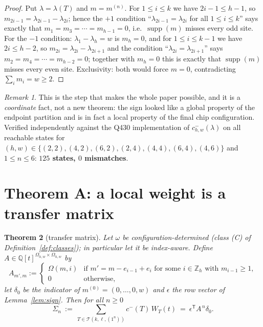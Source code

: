 \documentclass[11pt]{article}
\theoremstyle{plain}
\newtheorem{theorem}{Theorem}
\theoremstyle{definition}
\theoremstyle{remark}
\newtheorem{remark}[theorem]{Remark}
\newcommand{\Zh}{\mathbb{Z}_h}
\newcommand{\cm}{c^{-}}
\newcommand{\supp}{\operatorname{supp}}
\begin{document}
\begin{proof}
Put $\lambda=\lambda(T)$ and $m=m^{(n)}$. For $1\le i\le k$ we have $2i-1\le h-1$, so
$m_{2i-1}=\lambda_{2i-1}-\lambda_{2i}$; hence the $+1$ condition
``$\lambda_{2i-1}=\lambda_{2i}$ for all $1\le i\le k$'' says exactly that
$m_1=m_3=\cdots=m_{h-1}=0$, i.e.\ $\supp(m)$ misses every odd site. For the $-1$ condition:
$\lambda_1-\lambda_h=w$ is $m_h=0$, and for $1\le i\le k-1$ we have $2i\le h-2$, so
$m_{2i}=\lambda_{2i}-\lambda_{2i+1}$ and the condition ``$\lambda_{2i}=\lambda_{2i+1}$'' says
$m_2=m_4=\cdots=m_{h-2}=0$; together with $m_h=0$ this is exactly that $\supp(m)$ misses every
even site. Exclusivity: both would force $m=0$, contradicting $\sum_i m_i=w\ge2$.
\end{proof}

\begin{remark}
This is the step that makes the whole paper possible, and it is a \emph{coordinate} fact, not a
new theorem: the sign looked like a global property of the endpoint partition and is in fact a
local property of the final chip configuration. Verified independently against the
Q430 implementation of $\cm_{h,w}(\lambda)$ on all reachable states for
$(h,w)\in\{(2,2),(4,2),(6,2),(2,4),(4,4),(6,4),(4,6)\}$ and $1\le n\le6$: \textbf{$125$ states,
$0$ mismatches}.
\end{remark}

\section{Theorem A: a local weight is a transfer matrix}

\begin{theorem}[transfer matrix]\label{thm:tm}
Let $\omega$ be configuration-determined (class (C) of Definition~\ref{def:classes}); in
particular let it be index-aware. Define $A\in\mathbb{Q}[t]^{\Omega_{h,w}\times\Omega_{h,w}}$ by
\[
A_{m',m}:=\begin{cases}\Omega(m,i)&\text{if }m'=m-e_{i-1}+e_{i}\text{ for some }i\in\Zh\text{ with }m_{i-1}\ge1,\\0&\text{otherwise,}\end{cases}
\]
let $\delta_0$ be the indicator of $m^{(0)}=(0,\dots,0,w)$ and $\epsilon$ the row vector of
Lemma~\ref{lem:sign}. Then for all $n\ge0$
\[
\Sigma_n\ :=\ \sum_{T\in\mathcal T(k,\ell,(1^n))}\cm(T)\,W_T(t)\ =\ \epsilon^{\mathsf T}A^{\,n}\delta_0 .
\]
\end{theorem}
\end{document}
